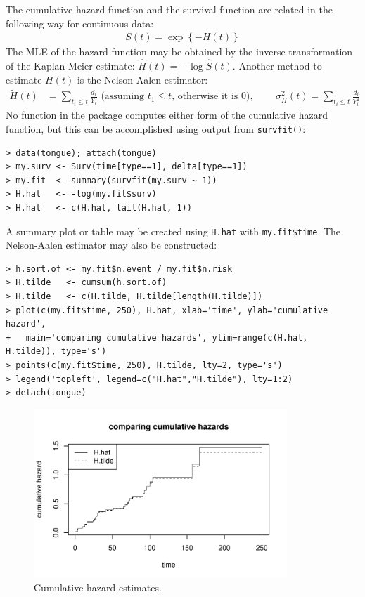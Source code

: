 \documentclass[11pt]{article}
\begin{document}
The cumulative hazard function and the survival function are related in the following way for continuous data:
\begin{align*}
S(t) = \exp\left\{-H(t)\right\}
\end{align*}
The MLE of the hazard function may be obtained by the inverse transformation of the Kaplan-Meier estimate: $\hat{H}(t) = -\log\hat{S}(t)$. Another method to estimate $H(t)$ is the Nelson-Aalen estimator:
\begin{align*}
\tilde{H}(t) &= \sum_{t_i \leq t} \frac{d_i}{Y_i}\text{ (assuming }t_1\leq t\text{, otherwise it is 0), }
		\qquad \sigma_H^2(t) = \sum_{t_i\leq t}\frac{d_i}{Y_i^2}
\end{align*}
No function in the  package computes either form of the cumulative hazard function, but this can be accomplished using output from \texttt{survfit()}:
\begin{verbatim}
> data(tongue); attach(tongue)
> my.surv <- Surv(time[type==1], delta[type==1])
> my.fit  <- summary(survfit(my.surv ~ 1))
> H.hat   <- -log(my.fit$surv)
> H.hat   <- c(H.hat, tail(H.hat, 1))
\end{verbatim}
A summary plot or table may be created using \texttt{H.hat} with \texttt{my.fit\$time}. The Nelson-Aalen estimator may also be constructed:
\begin{verbatim}
> h.sort.of <- my.fit$n.event / my.fit$n.risk
> H.tilde   <- cumsum(h.sort.of)
> H.tilde   <- c(H.tilde, H.tilde[length(H.tilde)])
> plot(c(my.fit$time, 250), H.hat, xlab='time', ylab='cumulative hazard',
+   main='comparing cumulative hazards', ylim=range(c(H.hat, H.tilde)), type='s')
> points(c(my.fit$time, 250), H.tilde, lty=2, type='s')
> legend('topleft', legend=c("H.hat","H.tilde"), lty=1:2)
> detach(tongue)
\end{verbatim}
\begin{figure}[htp]
\centering
\includegraphics[height=2.5in]{../figures/cumHazard} \vspace{-4mm}
\caption{Cumulative hazard estimates.}
\end{figure}
\end{document}
